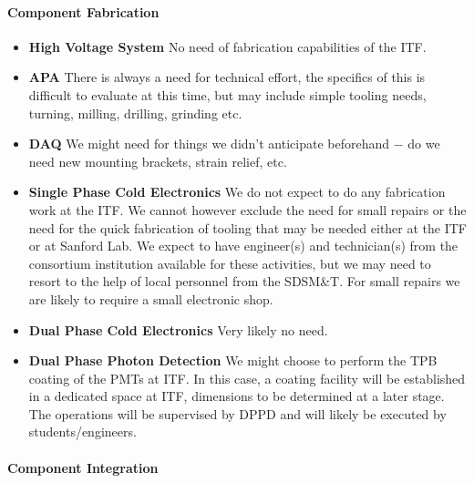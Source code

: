 \paragraph{\bf Component Fabrication} 

\begin{itemize}
  \item {\bf High Voltage System} No need of fabrication capabilities of the ITF.
  \item {\bf APA} There is always a need for technical effort, the specifics of this is difficult to 
evaluate at this time, but may include simple tooling needs, turning, milling, drilling, grinding etc.
  \item {\bf DAQ} We might need for things we didn’t anticipate beforehand $-$ do we need new mounting brackets, strain relief, etc.
  \item {\bf Single Phase Cold Electronics} We do not expect to do any fabrication work at 
the ITF. We cannot however exclude the need for small repairs or the need for the quick fabrication 
of tooling that may be needed either at the ITF or at Sanford Lab. We expect to have engineer(s) and 
technician(s) from the consortium institution available for these activities, but we may need to 
resort to the help of local personnel from the SDSM\&T. For small repairs we are likely to require a 
small electronic shop.
  \item {\bf Dual Phase Cold Electronics} Very likely no need.
  \item {\bf Dual Phase Photon Detection} We might choose to perform the TPB coating of the 
PMTs at ITF. In this case, a coating facility will be established in a dedicated space at ITF, 
dimensions to be determined at a later stage. The operations will be supervised by DPPD and will 
likely be executed by students/engineers. 
\end{itemize}

\paragraph{\bf Component Integration}

